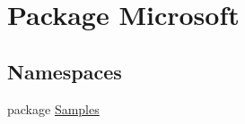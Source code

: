 \hypertarget{namespace_microsoft}{\section{Package Microsoft}
\label{namespace_microsoft}
}
\subsection*{Namespaces}
\begin{DoxyCompactItemize}
\item 
package \hyperlink{namespace_microsoft_1_1_samples}{Samples}
\end{DoxyCompactItemize}
